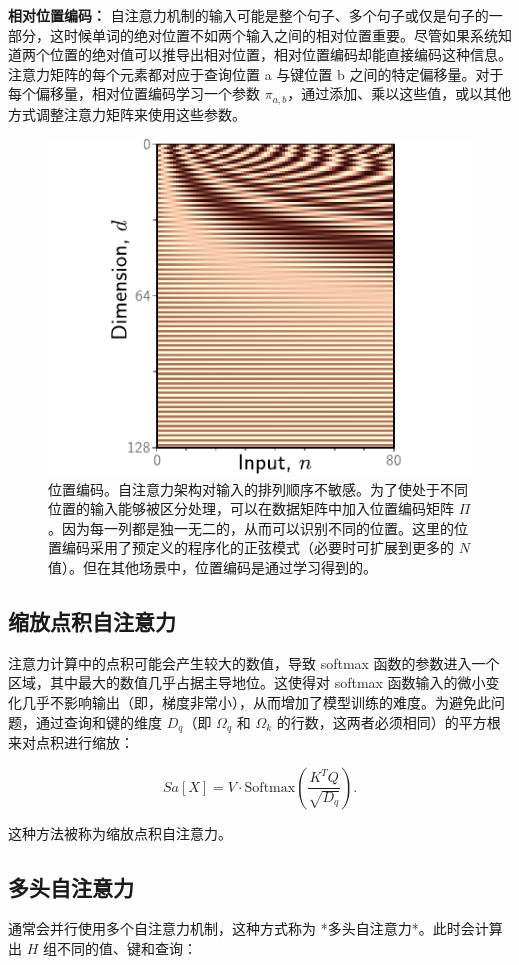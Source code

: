 \documentclass[lang=cn,newtx,10pt,scheme=chinese]{elegantbook}
\begin{document}
\textbf{相对位置编码：} 自注意力机制的输入可能是整个句子、多个句子或仅是句子的一部分，这时候单词的绝对位置不如两个输入之间的相对位置重要。尽管如果系统知道两个位置的绝对值可以推导出相对位置，相对位置编码却能直接编码这种信息。注意力矩阵的每个元素都对应于查询位置 a 与键位置 b 之间的特定偏移量。对于每个偏移量，相对位置编码学习一个参数 \(\pi_{a,b}\)，通过添加、乘以这些值，或以其他方式调整注意力矩阵来使用这些参数。

\begin{figure}[ht!]
\centering
\includegraphics[width=0.7\linewidth]{PDFFigures/UDLChap12PDF/TransformerPE.pdf}
\caption{位置编码。自注意力架构对输入的排列顺序不敏感。为了使处于不同位置的输入能够被区分处理，可以在数据矩阵中加入位置编码矩阵 \(\Pi\)。因为每一列都是独一无二的，从而可以识别不同的位置。这里的位置编码采用了预定义的程序化的正弦模式（必要时可扩展到更多的 \(N\) 值）。但在其他场景中，位置编码是通过学习得到的。}
\end{figure}


\subsection{缩放点积自注意力}
注意力计算中的点积可能会产生较大的数值，导致 softmax 函数的参数进入一个区域，其中最大的数值几乎占据主导地位。这使得对 softmax 函数输入的微小变化几乎不影响输出（即，梯度非常小），从而增加了模型训练的难度。为避免此问题，通过查询和键的维度 \(D_q\)（即 \(\Omega_q\) 和 \(\Omega_k\) 的行数，这两者必须相同）的平方根来对点积进行缩放：

\begin{equation}
Sa[X] = V \cdot \text{Softmax} \left( \frac{K^T Q}{\sqrt{D_q}} \right). 
\end{equation}

这种方法被称为缩放点积自注意力。

\subsection{多头自注意力}
通常会并行使用多个自注意力机制，这种方式称为 *多头自注意力*。此时会计算出 \(H\) 组不同的值、键和查询：
\end{document}
